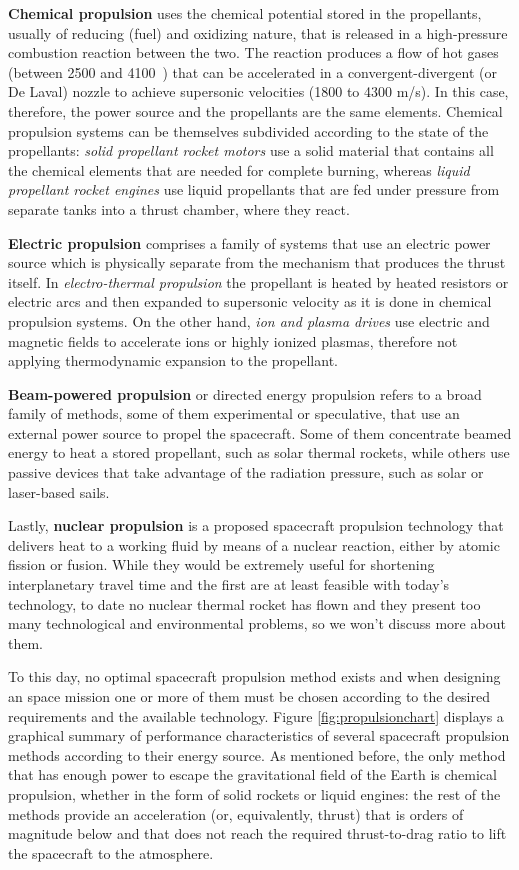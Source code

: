 \textbf{Chemical propulsion} uses the chemical potential stored in the propellants, usually of reducing (fuel) and oxidizing nature, that is released in a high-pressure combustion reaction between the two. The reaction produces a flow of hot gases (between 2500 and 4100~\celsius) that can be accelerated in a convergent-divergent (or De Laval) nozzle to achieve supersonic velocities (1800 to 4300 m/s). In this case, therefore, the power source and the propellants are the same elements. Chemical propulsion systems can be themselves subdivided according to the state of the propellants: \textit{solid propellant rocket motors} use a solid material that contains all the chemical elements that are needed for complete burning, whereas \textit{liquid propellant rocket engines} use liquid propellants that are fed under pressure from separate tanks into a thrust chamber, where they react.

\textbf{Electric propulsion} comprises a family of systems that use an electric power source which is physically separate from the mechanism that produces the thrust itself. In \textit{electro-thermal propulsion} the propellant is heated by heated resistors or electric arcs and then expanded to supersonic velocity as it is done in chemical propulsion systems. On the other hand, \textit{ion and plasma drives} use electric and magnetic fields to accelerate ions or highly ionized plasmas, therefore not applying thermodynamic expansion to the propellant.

\textbf{Beam-powered propulsion} or directed energy propulsion refers to a broad family of methods, some of them experimental or speculative, that use an external power source to propel the spacecraft. Some of them concentrate beamed energy to heat a stored propellant, such as solar thermal rockets, while others use passive devices that take advantage of the radiation pressure, such as solar or laser-based sails.

Lastly, \textbf{nuclear propulsion} is a proposed spacecraft propulsion technology that delivers heat to a working fluid by means of a nuclear reaction, either by atomic fission or fusion. While they would be extremely useful for shortening interplanetary travel time and the first are at least feasible with today's technology, to date no nuclear thermal rocket has flown and they present too many technological and environmental problems, so we won't discuss more about them.

To this day, no optimal spacecraft propulsion method exists and when designing an space mission one or more of them must be chosen according to the desired requirements and the available technology. Figure \ref{fig:propulsionchart} displays a graphical summary of performance characteristics of several spacecraft propulsion methods according to their energy source. As mentioned before, the only method that has enough power to escape the gravitational field of the Earth is chemical propulsion, whether in the form of solid rockets or liquid engines: the rest of the methods provide an acceleration (or, equivalently, thrust) that is orders of magnitude below and that does not reach the required thrust-to-drag ratio to lift the spacecraft to the atmosphere.

